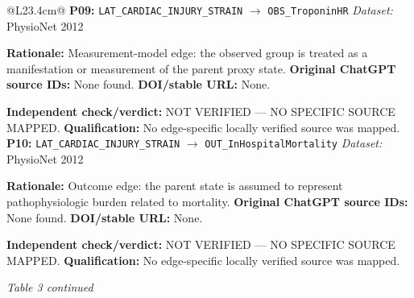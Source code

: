 \begin{tabular}{@{}L{23.4cm}@{}}
\addlinespace[2pt]
\midrule
\textbf{P09:} \nolinkurl{LAT_CARDIAC_INJURY_STRAIN} $\rightarrow$ \nolinkurl{OBS_TroponinHR} \hfill \textit{Dataset:} PhysioNet 2012\par\textbf{Rationale:} Measurement-model edge: the observed group is treated as a manifestation or measurement of the parent proxy state. \textbf{Original ChatGPT source IDs:} None found. \textbf{DOI/stable URL:} None.\par\textbf{Independent check/verdict:} NOT VERIFIED --- NO SPECIFIC SOURCE MAPPED. \textbf{Qualification:} No edge-specific locally verified source was mapped. \\
\addlinespace[2pt]
\midrule
\textbf{P10:} \nolinkurl{LAT_CARDIAC_INJURY_STRAIN} $\rightarrow$ \nolinkurl{OUT_InHospitalMortality} \hfill \textit{Dataset:} PhysioNet 2012\par\textbf{Rationale:} Outcome edge: the parent state is assumed to represent pathophysiologic burden related to mortality. \textbf{Original ChatGPT source IDs:} None found. \textbf{DOI/stable URL:} None.\par\textbf{Independent check/verdict:} NOT VERIFIED --- NO SPECIFIC SOURCE MAPPED. \textbf{Qualification:} No edge-specific locally verified source was mapped. \\
\addlinespace[2pt]
\midrule
\bottomrule
\end{tabular}
\clearpage
\textit{Table 3 continued}\par
